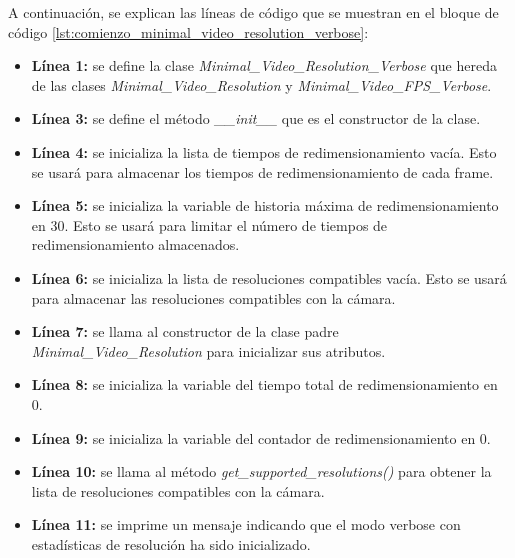 A continuación, se explican las líneas de código que se muestran en el bloque de código \ref{lst:comienzo_minimal_video_resolution_verbose}:
\begin{itemize}
    \item \textbf{Línea 1:} se define la clase \textit{Minimal\_Video\_Resolution\_Verbose} que hereda de las clases \textit{Minimal\_Video\_Resolution} y \textit{Minimal\_Video\_FPS\_Verbose}.
    \item \textbf{Línea 3:} se define el método \textit{\_\_init\_\_} que es el constructor de la clase.
    \item \textbf{Línea 4:} se inicializa la lista de tiempos de redimensionamiento vacía. Esto se usará para almacenar los tiempos de redimensionamiento de cada frame.
    \item \textbf{Línea 5:} se inicializa la variable de historia máxima de redimensionamiento en 30. Esto se usará para limitar el número de tiempos de redimensionamiento almacenados.
    \item \textbf{Línea 6:} se inicializa la lista de resoluciones compatibles vacía. Esto se usará para almacenar las resoluciones compatibles con la cámara.
    \item \textbf{Línea 7:} se llama al constructor de la clase padre \textit{Minimal\_Video\_Resolution} para inicializar sus atributos.
    \item \textbf{Línea 8:} se inicializa la variable del tiempo total de redimensionamiento en 0.
    \item \textbf{Línea 9:} se inicializa la variable del contador de redimensionamiento en 0.
    \item \textbf{Línea 10:} se llama al método \textit{get\_supported\_resolutions()} para obtener la lista de resoluciones compatibles con la cámara.
    \item \textbf{Línea 11:} se imprime un mensaje indicando que el modo verbose con estadísticas de resolución ha sido inicializado.
\end{itemize}
\vspace{\baselineskip}

